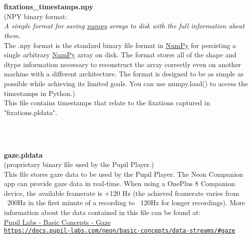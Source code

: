 \begin{description}
\begin{addmargin}[0em]{0em}
    \textbf{\\\\}
    \begin{addmargin}[1em]{0em} %
        \label{fixations_timestamps.npy}
        \textbf{fixations\_timestamps.npy}\\
        (NPY binary format:\\
        \textit{A simple format for saving}
        \href{https://numpy.org/doc/stable/reference/generated/numpy.lib.format.html#module-numpy.lib.format}{\textit{numpy}}
        \textit{arrays to disk with the full information about them.}\\
        The .npy format is the standard binary file format in 
        \href{https://numpy.org/doc/stable/reference/generated/numpy.lib.format.html#module-numpy.lib.format}{NumPy}
        for persisting a single arbitrary
        \href{https://numpy.org/doc/stable/reference/generated/numpy.lib.format.html#module-numpy.lib.format}{NumPy}
        array on disk. The format stores all of the shape and dtype information necessary to
        reconstruct the array correctly even on another machine with a different architecture.
        The format is designed to be as simple as possible while achieving its limited goals.
        You can use numpy.load() to access the timestamps in Python.)\\
        This file contains timestamps that relate to the fixations captured in "fixations.pldata". 
    \end{addmargin} %

    \textbf{\\\\}
    \begin{addmargin}[1em]{0em} %
        \label{gaze.pldata}
        \textbf{gaze.pldata}\\(proprietary binary file used by the Pupil Player.)\\
        This file stores gaze data to be used by the Pupil Player.
        The Neon Companion app can provide gaze data in real-time.
        When using a OnePlus 8 Companion device, the available framerate is +120 Hz
        (the achieved framerate varies from ~200Hz in the first minute of a recording to ~120Hz for longer recordings).
        More information about the data contained in this file can be found at:\\
        \href{https://docs.pupil-labs.com/neon/basic-concepts/data-streams/#gaze}
        {{Pupil Labs - Basic Concepts - Gaze}\\\nolinkurl{https://docs.pupil-labs.com/neon/basic-concepts/data-streams/\#gaze}}
    \end{addmargin} %


\end{addmargin}
\end{description}
